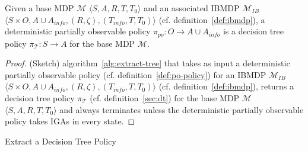 \begin{proposition}\label{def:po-policy}
    Given a base MDP $\mathcal{M}$ $\langle S, A, R, T, T_0\rangle$ and an associated IBMDP $\mathcal{M}_{IB}$ $\langle S \times O,A \cup A_{info}, (R, \zeta), (T_{info}, T, T_0)\rangle$ (cf. definition~\ref{def:ibmdp}), a deterministic partially observable policy $\pi_{po}: O \rightarrow A\cup A_{info}$ is a decision tree policy $\pi_{\mathcal{T}}: S \rightarrow A$ for the base MDP $\mathcal{M}$.
\end{proposition}

\begin{proof}(Sketch) algorithm~\ref{alg:extract-tree} that takes as input a deterministic partially observable policy (cf. definition~\ref{def:po-policy}) for an IBMDP $\mathcal{M}_{IB}$ $\langle S \times O,A \cup A_{info}, (R, \zeta), (T_{info}, T, T_0)\rangle$ (cf. definition~\ref{def:ibmdp}), returns a decision tree policy $\pi_{\mathcal{T}}$ (cf. definition~\ref{sec:dt}) for the base MDP $\mathcal{M}$ $\langle S, A, R, T, T_0\rangle$ and always terminates unless the deterministic partially observable policy takes IGAs in every state.
\end{proof}

\begin{algorithm}[t]
    
    
    \caption{Extract a Decision Tree Policy}\label{alg:extract-tree}
\end{algorithm}

